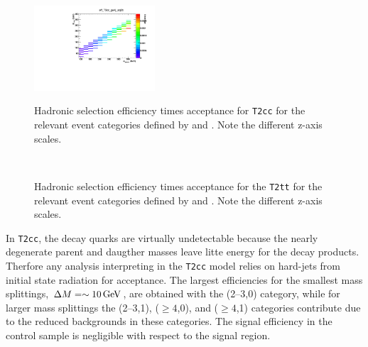 \begin{figure}[h!]
\begin{center}
{      \includegraphics[width=0.4\textwidth,page=2]{figures/sms/t2cc/v1/T2cc_eff}
    } 
    \caption{Hadronic selection efficiency times acceptance for \texttt{T2cc}
      for the relevant event categories defined by \njet and \nb.
      Note the different z-axis scales.}
    \label{fig:sms-eff-t2cc}
  \end{center}
\end{figure}

\begin{figure}[!h]
  \begin{center}
     \\
    \caption{Hadronic selection efficiency times acceptance for the \texttt{T2tt}
      for the relevant event categories defined by \njet and \nb.
       Note the different z-axis scales.}
    \label{fig:sms-eff-t2tt}
  \end{center}
\end{figure}

In \verb!T2cc!, the decay quarks are virtually undetectable because 
the nearly degenerate parent and daugther masses leave litte energy for the decay 
products. Therfore any analysis interpreting in the \verb!T2cc! model 
relies on hard-\Pt jets from initial state radiation for acceptance.  
The largest efficiencies for the smallest mass splittings,
$\Delta M = \sim10\,\text{Ge\hspace{-.08em}V}$, are obtained with the (2--3,0) category,
while for larger mass splittings the (2--3,1), ($\geq 4$,0), and
($\geq 4$,1) categories contribute due to the reduced backgrounds in
these categories. The signal efficiency in the \mj control sample is
negligible with respect to the signal region. 

